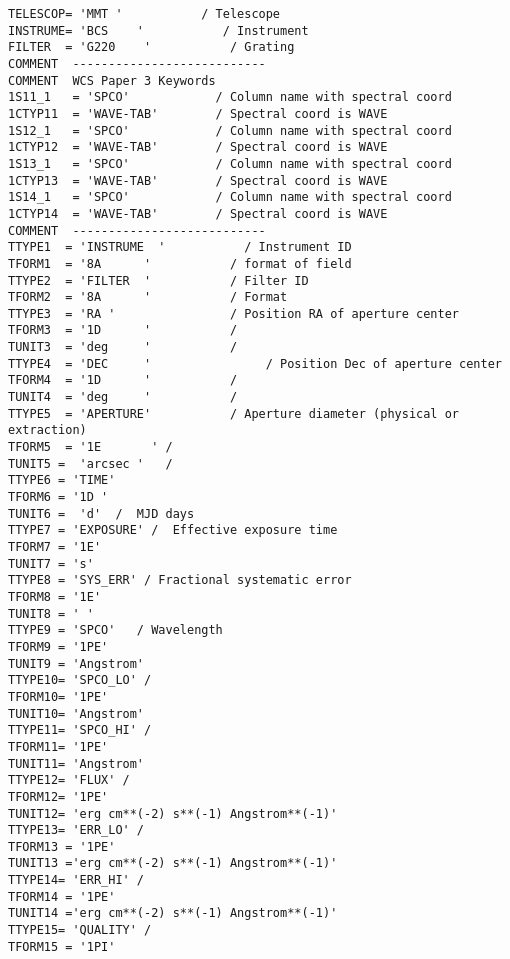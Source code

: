 \documentclass[11pt]{article}
\begin{document}
{\begin{verbatim}
TELESCOP= 'MMT '           / Telescope
INSTRUME= 'BCS    '           / Instrument
FILTER  = 'G220    '           / Grating
COMMENT  ---------------------------
COMMENT  WCS Paper 3 Keywords
1S11_1   = 'SPCO'            / Column name with spectral coord
1CTYP11  = 'WAVE-TAB'        / Spectral coord is WAVE 
1S12_1   = 'SPCO'            / Column name with spectral coord
1CTYP12  = 'WAVE-TAB'        / Spectral coord is WAVE 
1S13_1   = 'SPCO'            / Column name with spectral coord
1CTYP13  = 'WAVE-TAB'        / Spectral coord is WAVE 
1S14_1   = 'SPCO'            / Column name with spectral coord
1CTYP14  = 'WAVE-TAB'        / Spectral coord is WAVE 
COMMENT  ---------------------------
TTYPE1  = 'INSTRUME  '           / Instrument ID
TFORM1  = '8A      '           / format of field
TTYPE2  = 'FILTER  '           / Filter ID
TFORM2  = '8A      '           / Format
TTYPE3  = 'RA '                / Position RA of aperture center
TFORM3  = '1D      '           /
TUNIT3  = 'deg     '           /
TTYPE4  = 'DEC     '                / Position Dec of aperture center
TFORM4  = '1D      '           /
TUNIT4  = 'deg     '           /
TTYPE5  = 'APERTURE'           / Aperture diameter (physical or extraction)
TFORM5  = '1E       ' /
TUNIT5 =  'arcsec '   /
TTYPE6 = 'TIME'
TFORM6 = '1D '
TUNIT6 =  'd'  /  MJD days
TTYPE7 = 'EXPOSURE' /  Effective exposure time
TFORM7 = '1E'
TUNIT7 = 's' 
TTYPE8 = 'SYS_ERR' / Fractional systematic error
TFORM8 = '1E'
TUNIT8 = ' '
TTYPE9 = 'SPCO'   / Wavelength
TFORM9 = '1PE'
TUNIT9 = 'Angstrom'
TTYPE10= 'SPCO_LO' /
TFORM10= '1PE'
TUNIT10= 'Angstrom'
TTYPE11= 'SPCO_HI' /
TFORM11= '1PE'
TUNIT11= 'Angstrom'
TTYPE12= 'FLUX' /
TFORM12= '1PE'
TUNIT12= 'erg cm**(-2) s**(-1) Angstrom**(-1)'
TTYPE13= 'ERR_LO' /
TFORM13 = '1PE'
TUNIT13 ='erg cm**(-2) s**(-1) Angstrom**(-1)'
TTYPE14= 'ERR_HI' /
TFORM14 = '1PE'
TUNIT14 ='erg cm**(-2) s**(-1) Angstrom**(-1)'
TTYPE15= 'QUALITY' /
TFORM15 = '1PI'
\end{verbatim}
}
\end{document}
